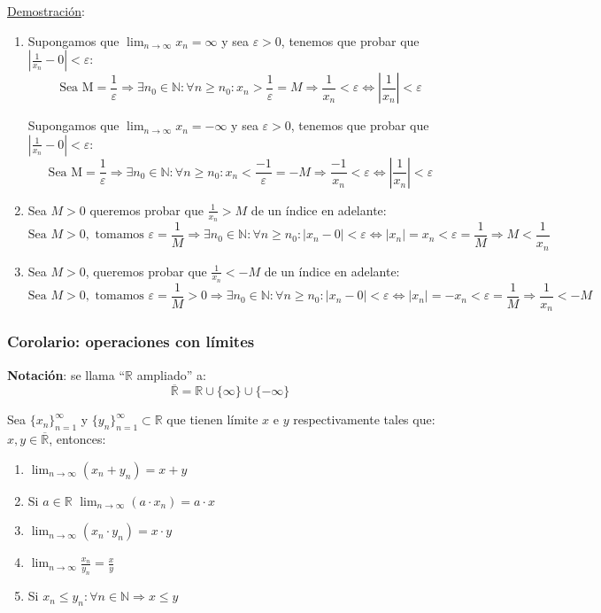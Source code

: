 \documentclass[10pt,a4paper,openright]{book}
\begin{document}
\underline{Demostración}:
\begin{enumerate}
\item Supongamos que $\lim_{n\rightarrow \infty} x_n=\infty$ y sea $\varepsilon>0$, tenemos que probar que $|\frac{1}{x_n}-0|<\varepsilon$:
$$\mbox{Sea M}=\frac{1}{\varepsilon}\Rightarrow \exists n_0\in \mathbb N: \forall n\geq n_0: x_n> \frac{1}{\varepsilon}=M\Rightarrow \frac{1}{x_n}<\varepsilon\Leftrightarrow |\frac{1}{x_n}|<\varepsilon$$

Supongamos que $\lim_{n\rightarrow \infty} x_n=-\infty$ y sea $\varepsilon>0$, tenemos que probar que $|\frac{1}{x_n}-0|<\varepsilon$:
$$\mbox{Sea M}=\frac{1}{\varepsilon}\Rightarrow \exists n_0\in \mathbb N: \forall n\geq n_0: x_n< \frac{-1}{\varepsilon}=-M\Rightarrow \frac{-1}{x_n}<\varepsilon\Leftrightarrow |\frac{1}{x_n}|<\varepsilon$$

\item Sea $M>0$ queremos probar que $\frac{1}{x_n}>M$ de un índice en adelante:
$$\mbox{Sea }M>0,\mbox{ tomamos } \varepsilon=\frac{1}{M}\Rightarrow \exists n_0\in \mathbb N: \forall n\geq n_0: |x_n-0|<\varepsilon\Leftrightarrow |x_n|=x_n<\varepsilon=\frac{1}{M}\Rightarrow M<\frac{1}{x_n}$$

\item Sea $M>0$, queremos probar que $\frac{1}{x_n}<-M$ de un índice en adelante:
$$\mbox{Sea }M>0,\mbox{ tomamos }\varepsilon=\frac{1}{M}>0\Rightarrow \exists n_0\in \mathbb N: \forall n\geq n_0: |x_n-0|<\varepsilon\Leftrightarrow |x_n|=-x_n<\varepsilon=\frac{1}{M}\Rightarrow \frac{1}{x_n}<-M$$
\end{enumerate}

\subsubsection*{Corolario: operaciones con límites}
\textbf{Notación}: se llama ``$\mathbb R$ ampliado'' a:
$$\overline{\mathbb R}=\mathbb R\cup \{\infty\}\cup \{-\infty\}$$

Sea $\{x_n\}_{n=1}^\infty$ y $\{y_n\}_{n=1}^\infty\subset \mathbb R$ que tienen límite $x$ e $y$ respectivamente tales que: $x,y\in \overline{\mathbb R}$, entonces:
\begin{enumerate}
\item $\lim_{n\rightarrow \infty}(x_n+y_n)=x+y$

\item Si $a\in \mathbb R$ $\lim_{n\rightarrow \infty} (a\cdot x_n)=a\cdot x$

\item $\lim_{n\rightarrow \infty}(x_n\cdot y_n)=x\cdot y$

\item $\lim_{n\rightarrow \infty}\frac{x_n}{y_n}=\frac{x}{y}$

\item Si $x_n\leq y_n: \forall n\in \mathbb N\Rightarrow x\leq y$
\end{enumerate}
\end{document}

